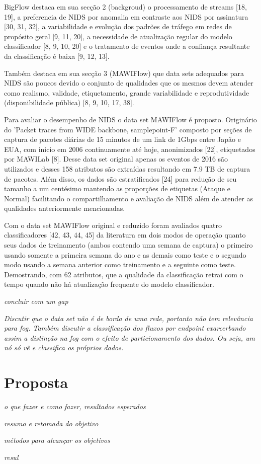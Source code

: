 BigFlow destaca em sua secção 2 (backgroud) o processamento de streams [18, 19],
a preferencia de NIDS por anomalia em contraste aos NIDS por assinatura [30, 31, 32],
a variabilidade e evolução dos padrões de tráfego em redes de propósito geral [9, 11, 20],
a necessidade de atualização regular do modelo classificador [8, 9, 10, 20] e
o tratamento de eventos onde a confiança resultante da classificação é baixa [9, 12, 13].

Também destaca em sua secção 3 (MAWIFlow) 
que data sets adequados para NIDS são poucos devido o conjunto de qualidades que os mesmos
devem atender como realismo, validade, etiquetamento, grande variabilidade
e reprodutividade (disponibilidade pública) [8, 9, 10, 17, 38].

Para avaliar o desempenho de NIDS o data set MAWIFlow é proposto. Originário do 
'Packet traces from WIDE backbone, samplepoint-F' composto por seções de captura de pacotes
diárias de 15 minutos de um link de 1Gbps entre Japão e EUA, com inicio em 2006 continuamente até hoje,
anonimizados [22], etiquetados por MAWILab [8].
Desse data set original apenas os eventos de 2016 são utilizados e desses 158 atributos são extraídas
resultando em 7.9 TB de captura de pacotes. Além disso, os dados são estratificados [24] para redução
de seu tamanho a um centésimo mantendo as proporções de etiquetas (Ataque e Normal)
facilitando o compartilhamento e avaliação de NIDS além de atender as qualidades anteriormente mencionadas.

Com o data set MAWIFlow original e reduzido foram avaliados quatro classificadores [42, 43, 44, 45]
da literatura em dois modos de operação quanto seus dados de treinamento
(ambos contendo uma semana de captura) o primeiro usando somente a primeira semana do ano e as demais
como teste e o segundo modo usando a semana anterior como treinamento e a seguinte como teste.
Demostrando, com 62 atributos, que a qualidade da classificação retrai com o tempo quando não há
atualização frequente do modelo classificador.

\textit{concluir com um gap}

\textit{Discutir que o data set não é de borda de uma rede, portanto não tem
relevância para fog. Também discutir a classificação dos fluxos por endpoint
exarcerbando assim a distinção na fog com o efeito de particionamento dos dados.
Ou seja, um nó só vê e classifica os próprios dados.}

\chapter{Proposta}
\label{cha:proposta}

\textit{o que fazer e como fazer, resultados esperados}

\textit{resumo e retomada do objetivo}

\textit{métodos para alcançar os objetivos}

\textit{resul}

